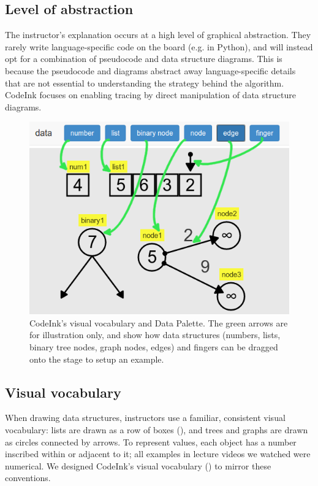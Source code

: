 \subsection{Level of abstraction}
The instructor's explanation occurs at a high level of graphical abstraction.
They rarely write language-specific code on the board (e.g. in Python), and will
instead opt for a combination of pseudocode and data structure diagrams. This is
because the pseudocode and diagrams abstract away language-specific details that
are not essential to understanding the strategy behind the algorithm. CodeInk
focuses on enabling tracing by direct manipulation of data structure diagrams.


\begin{figure}
\begin{center}
\includegraphics[width=0.8\columnwidth]{img/visual-vocabulary.png}
\end{center}

\caption{CodeInk's visual vocabulary and Data Palette. The green arrows are for
illustration only, and show how data structures (numbers, lists, binary tree
nodes, graph nodes, edges) and fingers can be dragged onto the stage to
setup an example.}
\label{fig:visual_vocab}
\end{figure}

\subsection{Visual vocabulary}
When drawing data structures, instructors use a familiar, consistent visual
vocabulary: lists are drawn as a row of boxes (), and
trees and graphs are drawn as circles connected by arrows. To represent values,
each object has a number inscribed within or adjacent to it; all examples in
lecture videos we watched were numerical. We designed CodeInk's visual
vocabulary () to mirror these conventions.

